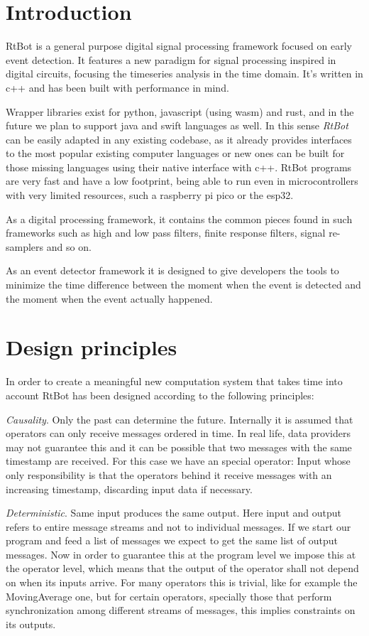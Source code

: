 \documentclass[preprint,1p,times]{elsarticle}
\begin{document}

\section{Introduction}
\label{}
RtBot is a general purpose digital signal processing framework focused on early event detection. 
It features a new paradigm for signal processing inspired in digital circuits, focusing the timeseries
analysis in the time domain.
It’s written in c++ and has been built with performance in mind.

Wrapper libraries exist for python, javascript (using wasm) and rust, and in the future we plan 
to support java and swift languages as well. In this sense \emph{RtBot} can be easily adapted in any 
existing codebase, as it already provides interfaces to the most popular existing computer 
languages or new ones can be built for those missing languages using their native interface 
with c++. RtBot programs are very fast and have a low footprint, being able to run even in 
microcontrollers with very limited resources, such a raspberry pi pico or the esp32.

As a digital processing framework, it contains the common pieces found in such frameworks such as 
high and low pass filters, finite response filters, signal re-samplers and so on. 

As an event detector framework it is designed to give developers the tools to minimize the time 
difference between the moment when the event is detected and the moment when the event actually 
happened.

\section{Design principles}
In order to create a meaningful new computation system that takes time into account RtBot has been designed
according to the following principles:

\textit{Causality}. Only the past can determine the future. Internally it is assumed that operators can only receive 
messages ordered in time. In real life, data providers may not guarantee this and it can be possible that two 
messages with the same timestamp are received. For this case we have an special operator: Input whose only 
responsibility is that the operators behind it receive messages with an increasing timestamp, discarding input 
data if necessary.

\textit{Deterministic}. Same input produces the same output. Here input and output refers to entire message streams and not
 to individual messages. If we start our program and feed a list of messages we expect to get the same list of output
 messages. Now in order to guarantee this at the program level we impose this at the operator level, which means that 
 the output of the operator shall not depend on when its inputs arrive. For many operators this is trivial, like for 
 example the MovingAverage one, but for certain operators, specially those that perform synchronization among different
  streams of messages, this implies constraints on its outputs.
\end{document}
